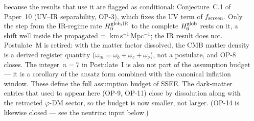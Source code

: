 \documentclass[12pt,a4paper]{article}
\begin{document}
because the results that use it are flagged as conditional: Conjecture~C.1 of
Paper~10 (UV--IR separability, OP-3), which fixes the UV term of
$f_{\rm screen}$. Only the step from the IR-regime rate
$H_0^{\rm glob,IR}$ to the complete $H_0^{\rm glob}$ rests on it, a shift well
inside the propagated $\pm\val{p9_hglob_sigma}$~km\,s$^{-1}$\,Mpc$^{-1}$; the IR
result does not. Postulate~M is retired: with the matter factor dissolved, the
CMB matter density is a derived register quantity ($\omega_m=\omega_b+\omega_c
+\omega_\nu$), not a postulate, and OP-8 closes. The integer~$n=7$ in
Postulate~I is also not part of the assumption budget --- it is a corollary
of the ansatz form combined with the canonical inflation window. These define the full assumption budget of SSEE. The dark-matter entries that used to
appear here (OP-9, OP-11) close by dissolution along with the retracted
$\varphi$-DM sector, so the budget is now smaller, not larger. (OP-14 is likewise closed --- see the neutrino input below.)
\end{document}
